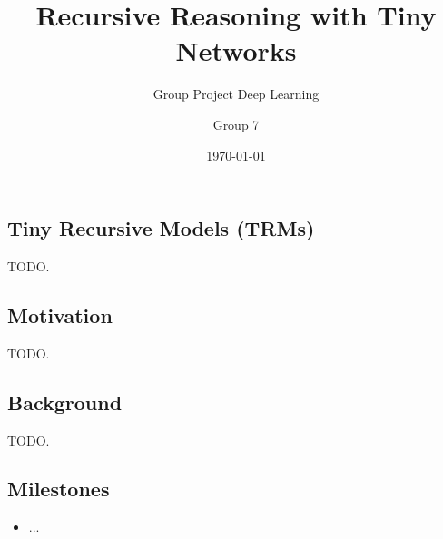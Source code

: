 \documentclass[dtu]{dtuarticle}
\title{Recursive Reasoning with Tiny Networks}
\subtitle{Group Project Deep Learning}
\author{Group 7}
\date{\today}
\begin{document}
	\maketitle

	\subsection*{Tiny Recursive Models (TRMs)}

	TODO.

	\subsection*{Motivation}

	TODO.

	\subsection*{Background}

	TODO.

	\subsection*{Milestones}

	\begin{itemize}
		\item ...
	\end{itemize}

	\nocite{paper}

	
	
\end{document}
